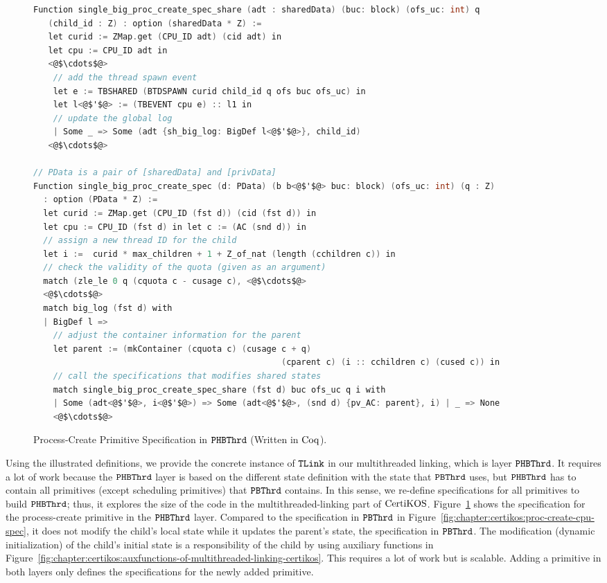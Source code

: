 \begin{figure}
\begin{lstlisting}[language=C, deletekeywords={int}]
Function single_big_proc_create_spec_share (adt : sharedData) (buc: block) (ofs_uc: int) q
   (child_id : Z) : option (sharedData * Z) :=
   let curid := ZMap.get (CPU_ID adt) (cid adt) in
   let cpu := CPU_ID adt in
   <@$\cdots$@>
    // add the thread spawn event
    let e := TBSHARED (BTDSPAWN curid child_id q ofs buc ofs_uc) in
    let l<@$'$@> := (TBEVENT cpu e) :: l1 in
    // update the global log
    | Some _ => Some (adt {sh_big_log: BigDef l<@$'$@>}, child_id)
   <@$\cdots$@>
      
// PData is a pair of [sharedData] and [privData]
Function single_big_proc_create_spec (d: PData) (b b<@$'$@> buc: block) (ofs_uc: int) (q : Z) 
  : option (PData * Z) :=
  let curid := ZMap.get (CPU_ID (fst d)) (cid (fst d)) in
  let cpu := CPU_ID (fst d) in let c := (AC (snd d)) in
  // assign a new thread ID for the child
  let i :=  curid * max_children + 1 + Z_of_nat (length (cchildren c)) in
  // check the validity of the quota (given as an argument)
  match (zle_le 0 q (cquota c - cusage c), <@$\cdots$@>
  <@$\cdots$@>
  match big_log (fst d) with
  | BigDef l =>
    // adjust the container information for the parent
    let parent := (mkContainer (cquota c) (cusage c + q)
                                                  (cparent c) (i :: cchildren c) (cused c)) in
    // call the specifications that modifies shared states 
    match single_big_proc_create_spec_share (fst d) buc ofs_uc q i with
    | Some (adt<@$'$@>, i<@$'$@>) => Some (adt<@$'$@>, (snd d) {pv_AC: parent}, i) | _ => None
    <@$\cdots$@>       
\end{lstlisting}
\caption{Process-Create Primitive Specification in ${{\mathrm{\texttt{PHBThrd}}}}$ (Written in $\mathrm{Coq}$).}
\label{fig:chapter:certikos:proc-create-cpu-spec-phbthred}
\end{figure}

Using the illustrated definitions, we provide the concrete instance of ${{\mathrm{\texttt{TLink}}}}$ in our multithreaded linking,
which is layer ${{\mathrm{\texttt{PHBThrd}}}}$. 
It requires a lot of work because the  
${{\mathrm{\texttt{PHBThrd}}}}$ layer is based on the different state definition with the state that 
${{\mathrm{\texttt{PBThrd}}}}$ uses,
but ${{\mathrm{\texttt{PHBThrd}}}}$ has to contain all primitives (except scheduling primitives)
that ${{\mathrm{\texttt{PBThrd}}}}$ contains.
In this sense, 
we re-define specifications for all primitives to build ${{\mathrm{\texttt{PHBThrd}}}}$; thus, it explores the size of the code in the multithreaded-linking part of $\mathrm{CertiKOS}$.
Figure~\ref{fig:chapter:certikos:proc-create-cpu-spec-phbthred} shows the specification for the process-create primitive in the ${{\mathrm{\texttt{PHBThrd}}}}$ layer.
Compared to the specification in ${{\mathrm{\texttt{PBThrd}}}}$ in Figure~\ref{fig:chapter:certikos:proc-create-cpu-spec},
 it does not modify the child's local state while it updates the 
 parent's state, the specification in ${{\mathrm{\texttt{PBThrd}}}}$.
The modification (dynamic initialization) of the child's initial state is a responsibility of the child by using auxiliary functions in Figure~\ref{fig:chapter:certikos:auxfunctions-of-multithreaded-linking-certikos}.
This  requires a lot of work but is scalable.
Adding a primitive in both layers only defines the specifications for the newly added primitive.


